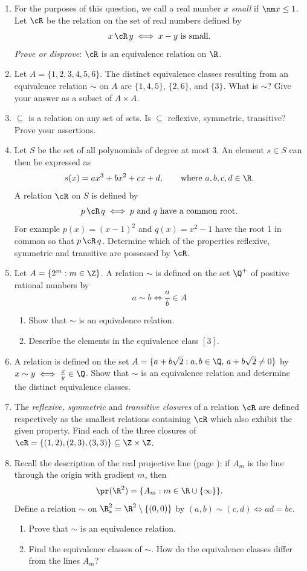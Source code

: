\begin{enumerate}
	\item For the purposes of this question, we call a real number $x$ \emph{small} if $\nm x\le 1$. Let $\cR$ be the relation on the set of real numbers defined by
	\[x\,\cR\,y \iff x-y \text{ is small}.\]
	\emph{Prove or disprove}: $\cR$ is an equivalence relation on $\R$.

	\item Let $A=\{1,2,3,4,5,6\}$. The distinct equivalence classes resulting from an equivalence relation $\sim$ on $A$ are $\{1,4,5\}$, $\{2,6\}$, and $\{3\}$. What is $\sim$? Give your answer as a subset of $A\times A$.

	\item $\subseteq$ is a relation on any set of sets. Is $\subseteq$ reflexive, symmetric, transitive? Prove your assertions.

	\item Let $S$ be the set of all polynomials of degree at most 3. An element $s\in S$ can then be expressed as
  \[s(x)=ax^3+bx^2+cx+d,\qquad\text{where $a,b,c,d\in\R$.}\]
  A relation $\cR$ on $S$ is defined by
  \[p\,\cR\,q\iff p\text{ and $q$ have a common root.}\]
  For example $p(x)=(x-1)^2$ and $q(x)=x^2-1$ have the root 1 in common so that $p\,\cR\,q$. Determine which of the properties reflexive, symmetric and transitive are possessed by $\cR$.

  \item Let $A=\{2^m:m\in\Z\}$. A relation $\sim$ is defined on the set $\Q^+$ of positive rational numbers by
  \[a\sim b\iff \frac ab\in A\]
  \begin{enumerate}
    \item Show that $\sim$ is an equivalence relation.
    \item Describe the elements in the equivalence class $[3]$.
  \end{enumerate}

  \item A relation is defined on the set $A=\{a+b\sqrt 2:a,b\in\Q,\,a+b\sqrt 2\neq 0\}$ by $x\sim y\iff \frac xy\in\Q$. Show that $\sim$ is an equivalence relation and determine the distinct equivalence classes.

	\item The \emph{reflexive, symmetric} and \emph{transitive closures} of a relation $\cR$ are defined respectively as the smallest relations containing $\cR$ which also exhibit the given property. Find each of the three closures of $\cR=\{(1,2),(2,3),(3,3)\}\subseteq\Z\times\Z$.

	\item Recall the description of the real projective line (page \pageref{ex:projline}): if $A_m$ is the line through the origin with gradient $m$, then
	\[\pr(\R^2)=\{A_m:m\in\R\cup\{\infty\}\}.\]
	Define a relation $\sim$ on $\R^2_*=\R^2\setminus\{(0,0)\}$ by $(a,b)\sim(c,d)\iff ad=bc$.
	\begin{enumerate}
	  \item Prove that $\sim$ is an equivalence relation.
	  \item Find the equivalence classes of $\sim$. How do the equivalence classes differ from the lines $A_m$?
	\end{enumerate}
  

\end{enumerate}
